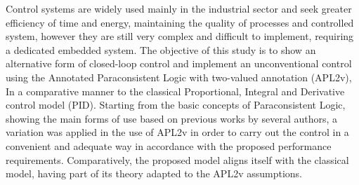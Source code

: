 Control systems are widely used mainly in the industrial sector and seek greater efficiency of time and energy, maintaining the quality of processes and controlled system,
however they are still very complex and difficult to implement, requiring a dedicated embedded system.
The objective of this study is to show an alternative form of closed-loop control and implement an unconventional control using the Annotated Paraconsistent Logic with two-valued annotation (APL2v),
In a comparative manner to the classical Proportional, Integral and Derivative control model (PID).
Starting from the basic concepts of Paraconsistent Logic,
showing the main forms of use based on
previous works by several authors,
a variation was applied in the use of APL2v
in order to carry out the control in a convenient and adequate way
in accordance with the proposed performance requirements.
Comparatively, the proposed model aligns itself with the classical model, having part of its theory adapted to the APL2v assumptions.

